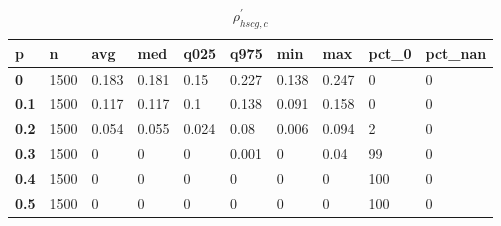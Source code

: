 \begin{table}[h]
 \centering 
\footnotesize
\caption{$\rho_{hscg,c}^\prime $}
\label{tab:alphahscgc}
\begin{tabular}[h]{|l|l|l|l|l|l|l|l|l|l|
    } \hline
\textbf{ p} & \textbf{ n} & \textbf{ avg} & \textbf{ med} & \textbf{ q025} & \textbf{ q975} & \textbf{ min} & \textbf{ max} & \textbf{ pct\_0} & \textbf{ pct\_nan}
    \\ \hline
  \textbf{  0} & 1500 & 0.183 & 0.181 &  0.15 & 0.227 & 0.138 & 0.247 &   0 & 0
    \\ \hline
  \textbf{0.1} & 1500 & 0.117 & 0.117 &   0.1 & 0.138 & 0.091 & 0.158 &   0 & 0
    \\ \hline
  \textbf{0.2} & 1500 & 0.054 & 0.055 & 0.024 &  0.08 & 0.006 & 0.094 &   2 & 0
    \\ \hline
  \textbf{0.3} & 1500 &     0 &     0 &     0 & 0.001 &     0 &  0.04 &  99 & 0
    \\ \hline
  \textbf{0.4} & 1500 &     0 &     0 &     0 &     0 &     0 &     0 & 100 & 0
    \\ \hline
  \textbf{0.5} & 1500 &     0 &     0 &     0 &     0 &     0 &     0 & 100 & 0
    \\ \hline
 \end{tabular}
 \end{table}

